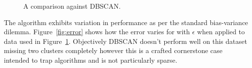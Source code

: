 \documentclass{ecsarticle}     %
\begin{document}
\begin{figure}[ht]
   \centering
   \caption{A comparison against DBSCAN.}
   \label{fig:compare}
\end{figure}

The algorithm exhibits variation in performance as per the standard bias-variance dilemma.
Figure~\ref{fig:error} shows how the error varies for with $\epsilon$ when applied to data used in Figure~\ref{fig:compare}.
Objectively DBSCAN doesn't perform well on this dataset missing two clusters completely however this is a crafted cornerstone case intended to trap algorithms and is not particularly sparse.
\end{document}
